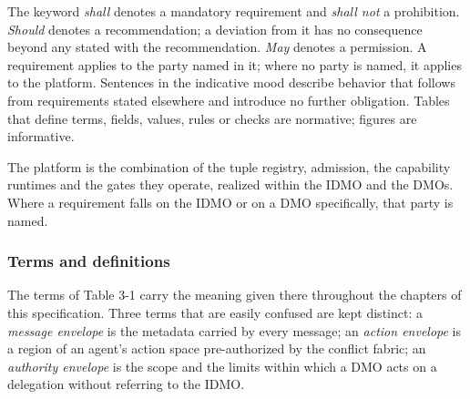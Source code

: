 The keyword \emph{shall} denotes a mandatory requirement and \emph{shall
not} a prohibition. \emph{Should} denotes a recommendation; a deviation
from it has no consequence beyond any stated with the recommendation.
\emph{May} denotes a permission. A requirement applies to the party
named in it; where no party is named, it applies to the platform.
Sentences in the indicative mood describe behavior that follows from
requirements stated elsewhere and introduce no further obligation.
Tables that define terms, fields, values, rules or checks are normative;
figures are informative.

The platform is the combination of the tuple registry, admission, the
capability runtimes and the gates they operate, realized within the IDMO
and the DMOs. Where a requirement falls on the IDMO or on a DMO
specifically, that party is named.

\hypertarget{terms-and-definitions}{%
\subsubsection{Terms and definitions}\label{terms-and-definitions}}

The terms of Table 3-1 carry the meaning given there throughout the
chapters of this specification. Three terms that are easily confused are
kept distinct: a \emph{message envelope} is the metadata carried by
every message; an \emph{action envelope} is a region of an agent's
action space pre-authorized by the conflict fabric; an \emph{authority
envelope} is the scope and the limits within which a DMO acts on a
delegation without referring to the IDMO.

